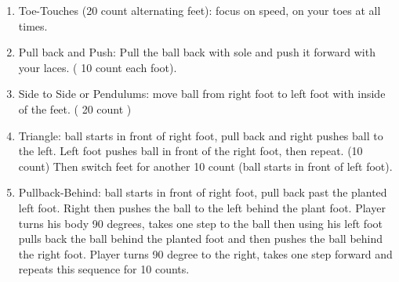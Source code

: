 \documentclass[10pt,letterpaper]{article}
\newenvironment{evenBlock}[1]{%
    \tcolorbox[beamer,%
    noparskip,breakable,
    colback=LightGreen,colframe=DarkGreen,%
    colbacklower=LimeGreen!75!LightGreen,%
    title=#1]}%
    {\endtcolorbox}
\begin{document}
\begin{evenBlock}{Coerver Touches - Intro (20 min) }
    \begin{enumerate}
        \item Toe-Touches (20 count alternating feet): focus on speed, on your toes at all times.
        \item Pull back and Push: Pull the ball back with sole and push it forward with your laces. ( 10 count each foot).
        \item Side to Side or Pendulums: move ball from right foot to left foot with inside of the feet. ( 20 count )
        \item Triangle: ball starts in front of right foot, pull back and right pushes ball to the left.  Left foot pushes ball in front of the right foot, then repeat. (10 count)  Then switch feet for another 10 count (ball starts in front of left foot).
        \item Pullback-Behind: ball starts in front of right foot, pull back past the planted left foot.  Right then pushes the ball to the left behind the plant foot.  Player turns his body 90 degrees, takes one step to the ball then using his left foot pulls back the ball behind the planted foot and then pushes the ball behind the right foot.  Player turns 90 degree to the right, takes one step forward and repeats this sequence for 10 counts.
    \end{enumerate}
\end{evenBlock}
\end{document}
